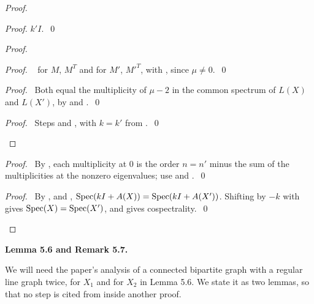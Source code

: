 \begin{proof}
\begin{proof}
  $k'I$.~\qed\end{proof}
 \begin{proof}
  \begin{proof}\pf\  for $M$, $M^T$ and for $M'$, $M'^T$, with
   , since $\mu\ne0$.~\qed\end{proof}
  \begin{proof}\pf\ Both equal the multiplicity of $\mu-2$ in the common spectrum of $L(X)$
   and $L(X')$, by  and .~\qed\end{proof}
  \qedstep
  \begin{proof}\pf\ Steps  and , with $k=k'$ from
   .~\qed\end{proof}
 \end{proof}
 \begin{proof}\pf\ By , each multiplicity at $0$ is the order $n=n'$ minus the
  sum of the multiplicities at the nonzero eigenvalues; use  and
  .~\qed\end{proof}
 \qedstep
 \begin{proof}\pf\ By ,  and ,
  $\mathop{\mathrm{Spec}}\nolimits(kI+A(X))=\mathop{\mathrm{Spec}}\nolimits(kI+A(X'))$. Shifting by $-k$ with  gives
  $\mathop{\mathrm{Spec}}\nolimits(X)=\mathop{\mathrm{Spec}}\nolimits(X')$, and  gives cospectrality.~\qed\end{proof}
\end{proof}

\medskip\noindent\textbf{Lemma 5.6 and Remark 5.7.}

We will need the paper's analysis of a connected bipartite graph with a regular line graph
twice, for $X_1$ and for $X_2$ in Lemma 5.6. We state it as two lemmas, so that no step is cited
from inside another proof.

